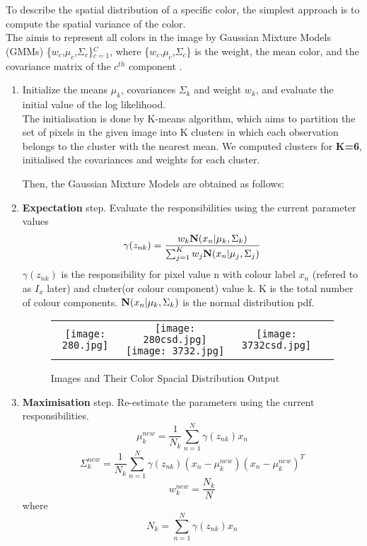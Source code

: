 \documentclass[11pt]{report}
\begin{document}
To describe the spatial distribution of a specific color, the simplest approach is to compute the spatial variance of the color. \\
The aimis to represent all colors in the image by Gaussian Mixture Models (GMMs) \{$w_c$,$\mu_c$,$\Sigma_c$\}$^C_{c=1}$, where \{$w_c$,$\mu_c$,$\Sigma_c$\} is the weight, the mean color, and the covariance matrix of the $c^{th}$ component \cite{patternrecognition}.\\
\begin{enumerate}
\item Initialize the means $\mu_k$, covariances $\Sigma_k$ and weight $w_k$, and evaluate the initial value of the log likelihood. \\
The initialisation is done by K-means algorithm, which aims to partition the set of pixels in the given image into K clusters in which each observation belongs to the cluster with the nearest mean.
We computed clusters for {\bf K=6}, initialised the covariances and weights for each cluster.

Then, the  Gaussian Mixture Models are obtained as follows:

\item {\bf Expectation }step. Evaluate the responsibilities using the current parameter values
\begin{equation}
\gamma(z_{nk}) = \frac {w_k{\bf  N}(x_n|\mu_k,\Sigma_k)}{\sum_{j=1}^K w_j {\bf  N}(x_n|\mu_j,\Sigma_j)}
\end{equation} 
$\gamma(z_{nk}) $  is the responsibility for pixel value n with colour label $x_n$ (refered to as $I_x$ later) and cluster(or colour component) value k.
K is the total number of colour components.
${\bf  N}(x_n|\mu_k,\Sigma_k)$  is the normal distribution pdf.


\begin{figure}[h!]
\begin{tabular}{cccc}
\texttt{[image: 280.jpg]} 
& \texttt{[image: 280csd.jpg]}
\hspace*{4pt}
\texttt{[image: 3732.jpg]} & \texttt{[image: 3732csd.jpg]}
\end{tabular}
\label{tab:gt}
\caption{Images and Their Color Spacial Distribution Output}
\end{figure}

\item {\bf Maximisation} step. Re-estimate the parameters using the current responsibilities.
\begin{equation}
\mu^{new}_k = \frac{1}{N_k} \sum^{N}_{n=1} \gamma(z_{nk}) x_n
\end{equation} 
\begin{equation}
\Sigma^{new}_k = \frac{1}{N_k} \sum^{N}_{n=1} \gamma(z_{nk}) (x_n - \mu^{new}_k )(x_n - \mu^{new}_k )^T
\end{equation} 
\begin{equation}
w_k^{new} = \frac {N_k}{N}
\end{equation} 
where
\begin{equation}
N_k = \sum ^N_{n=1} \gamma(z_{nk}) x_n
\end{equation} 


\end{enumerate}
\end{document}

